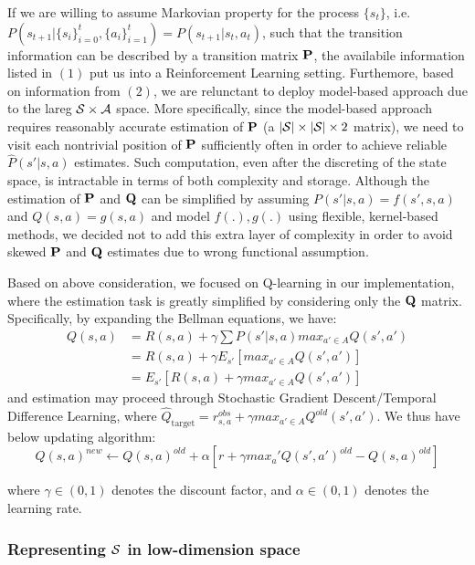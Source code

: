 \documentclass[11pt]{article}
\theoremstyle{definition}
\begin{document}
If we are willing to assume Markovian property for the process $\{s_t\}$, i.e. $P(s_{t+1} \big| \{s_i\}_{i=0}^{t}, \{a_i\}_{i=1}^{t}) = P(s_{t+1} \big| s_t, a_t) $, such that the transition information can be described by a transition matrix ${\bf P}$, the availabile information listed in $(1)$ put us into a Reinforcement Learning setting. Furthemore, based on information from $(2)$, we are relunctant to deploy model-based approach due to the lareg ${\cal S} \times {\cal A}$ space. More specifically, since the model-based approach requires reasonably accurate estimation of ${\bf P}$ (a $|{\cal S}| \times |{\cal S}| \times 2$ matrix), we need to visit each nontrivial position of ${\bf P}$  sufficiently often in order to achieve reliable $\hat{P}(s'|s, a)$ estimates. Such computation, even after the discreting of the state space, is intractable in terms of both complexity and storage. Although the estimation of ${\bf P}$ and ${\bf Q}$ can be simplified by assuming $P(s'|s, a) = f(s', s, a)$ and $Q(s, a) = g(s, a)$ and model $f(.), g(.)$ using flexible, kernel-based methods, we decided not to add this extra layer of complexity in order to avoid skewed ${\bf P}$ and ${\bf Q}$ estimates due to wrong functional assumption.

Based on above consideration, we focused on Q-learning in our implementation, where the estimation task is greatly simplified by considering only the ${\bf Q}$ matrix. Specifically, by expanding the Bellman equations, we have: 
\begin{align*}
Q(s,a) &= R(s,a)+\gamma\sum P(s'|s,a) max_{a'\in A}Q(s',a')\\
&= R(s,a)+\gamma E_{s'}[max_{a'\in A}Q(s',a')]\\
&=E_{s'}[R(s,a)+\gamma max_{a'\in A}Q(s',a')]
\end{align*}
and estimation may proceed through Stochastic Gradient Descent/Temporal Difference Learning, where $\hat{Q}_{\mbox{target}} = r_{s, a}^{obs} +\gamma max_{a'\in A}Q^{old}(s',a')$. We thus have below updating algorithm:
$$Q(s,a)^{new} \leftarrow 
Q(s,a)^{old} + \alpha [r + \gamma  max_a' Q(s',a')^{old} - Q(s,a)^{old} ]$$

where $\gamma \in (0, 1)$ denotes the discount factor, and $\alpha \in (0, 1)$ denotes the learning rate.

\subsubsection{\textbf{Representing ${\cal S}$ in low-dimension space}}
\end{document}
